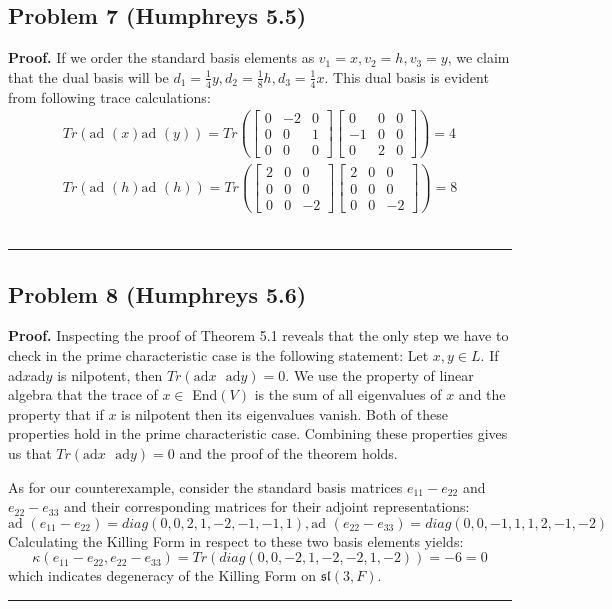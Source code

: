 \documentclass[12pt]{article}%
\newenvironment{proof}[1][Proof]{\textbf{#1.} }{\ \rule{0.5em}{0.5em}}
\begin{document}
\subsection*{Problem 7 (Humphreys 5.5)}
\begin{proof}
  If we order the standard basis elements as $v_1 = x, v_2 = h, v_3 = y$, we claim that the dual basis will be $d_1 = \frac{1}{4}y, d_2 = \frac{1}{8}h, d_3 = \frac{1}{4}x$. This dual basis is evident from following trace calculations:
  \begin{gather}
    Tr(\text{ad }(x)\text{ad }(y)) = Tr(\left[ \begin{array}{ccc} 0 & -2 & 0 \\ 0 & 0 & 1 \\ 0 & 0 & 0  \end{array} \right] \left[ \begin{array}{ccc} 0 & 0 & 0 \\ -1 & 0 & 0 \\ 0 & 2 & 0  \end{array} \right]) = 4 \\
    Tr(\text{ad }(h)\text{ad }(h)) = Tr(\left[ \begin{array}{ccc} 2 & 0 & 0 \\ 0 & 0 & 0 \\ 0 & 0 & -2  \end{array} \right] \left[ \begin{array}{ccc} 2 & 0 & 0 \\ 0 & 0 & 0 \\ 0 & 0 & -2  \end{array} \right]) = 8
  \end{gather}
\end{proof}

\subsection*{Problem 8 (Humphreys 5.6)}
\begin{proof}
  Inspecting the proof of Theorem 5.1 reveals that the only step we have to check in the prime characteristic case is the following statement: Let $x,y \in L$. If ad$x$ad$y$ is nilpotent, then $Tr(\text{ad$x$ }\text{ad}y) = 0$. We use the property of linear algebra that the trace of $x \in$ End$(V)$ is the sum of all eigenvalues of $x$ and the property that if $x$ is nilpotent then its eigenvalues vanish. Both of these properties hold in the prime characteristic case. Combining these properties gives us that $Tr(\text{ad$x$ }\text{ad}y) = 0$ and the proof of the theorem holds. \newline

  As for our counterexample, consider the standard basis matrices $e_{11} - e_{22}$ and $e_{22} - e_{33}$ and their corresponding matrices for their adjoint representations:
  $$\text{ad }(e_{11} - e_{22}) = diag (0,0,2,1,-2,-1,-1,1), \text{ad }(e_{22} - e_{33}) = diag (0,0,-1,1,1,2,-1,-2) $$
  Calculating the Killing Form in respect to these two basis elements yields:
  $$\kappa(e_{11} - e_{22},e_{22} - e_{33}) = Tr(diag (0,0,-2,1,-2,-2,1,-2)) = -6 = 0 $$
  which indicates degeneracy of the Killing Form on $\mathfrak{sl}(3,F)$.
\end{proof}
\end{document}
